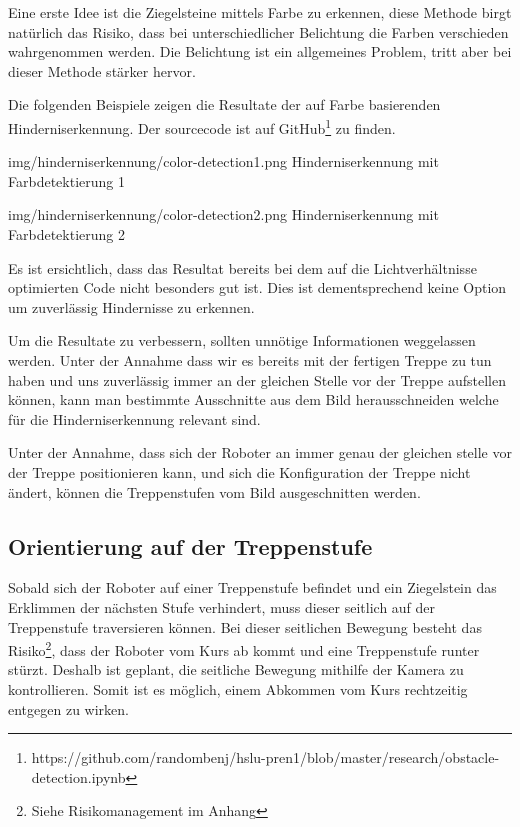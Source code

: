 Eine erste Idee ist die Ziegelsteine mittels Farbe zu erkennen, diese Methode
birgt natürlich das Risiko, dass bei unterschiedlicher Belichtung die 
Farben verschieden wahrgenommen werden. Die Belichtung ist ein allgemeines Problem,
tritt aber bei dieser Methode stärker hervor.

Die folgenden Beispiele zeigen die Resultate der auf Farbe basierenden 
Hinderniserkennung. Der sourcecode ist auf GitHub\footnote{https://github.com/randombenj/hslu-pren1/blob/master/research/obstacle-detection.ipynb} zu finden.

\image
  {img/hinderniserkennung/color-detection1.png}
  {Hinderniserkennung mit Farbdetektierung 1}

\image
  {img/hinderniserkennung/color-detection2.png}
  {Hinderniserkennung mit Farbdetektierung 2}

Es ist ersichtlich, dass das Resultat bereits bei dem auf die Lichtverhältnisse optimierten
Code nicht besonders gut ist. Dies ist dementsprechend keine Option um
zuverlässig Hindernisse zu erkennen.

Um die Resultate zu verbessern, sollten unnötige Informationen weggelassen werden.
Unter der Annahme dass wir es bereits mit der fertigen Treppe zu tun haben
und uns zuverlässig immer an der gleichen Stelle vor der Treppe
aufstellen können, kann man bestimmte Ausschnitte aus dem Bild herausschneiden
welche für die Hinderniserkennung relevant sind.

Unter der Annahme, dass sich der Roboter an immer genau der gleichen stelle vor der Treppe positionieren kann,
und sich die Konfiguration der Treppe nicht ändert, können die Treppenstufen vom Bild
ausgeschnitten werden.



\newpage

\subsection{Orientierung auf der Treppenstufe}
\label{orientierungAufTreppenstufe}
Sobald sich der Roboter auf einer Treppenstufe befindet und ein Ziegelstein das Erklimmen der nächsten Stufe verhindert, muss dieser seitlich auf der Treppenstufe traversieren können. Bei dieser seitlichen Bewegung besteht das Risiko\footnote{Siehe Risikomanagement im Anhang}, dass der Roboter vom Kurs ab kommt und eine Treppenstufe runter stürzt.
Deshalb ist geplant, die seitliche Bewegung mithilfe der Kamera zu kontrollieren. Somit ist es möglich, einem Abkommen vom Kurs rechtzeitig entgegen zu wirken.

